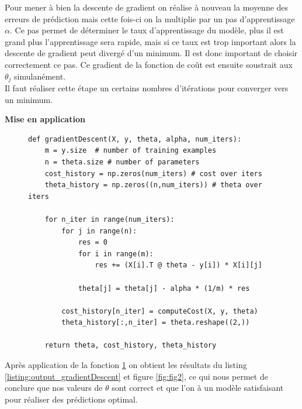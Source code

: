 Pour mener à bien la descente de gradient on réalise à nouveau la moyenne des erreurs de prédiction mais cette fois-ci on la multiplie par un pas d'apprentissage $\alpha$. Ce pas permet de déterminer le taux d'apprentissage du modèle, 
plus il est grand plus l'apprentissage sera rapide, mais si ce taux est trop important alors la descente de gradient peut divergé d'un minimum. Il est donc important de choisir correctement ce pas. Ce gradient de la fonction de coût est ensuite
soustrait aux $\theta_j$ simulanément. \\
Il faut réaliser cette étape un certains nombres d'itérations pour converger vers un minimum.

\clearpage

\vspace{.5cm}
\noindent
\textbf{Mise en application}
\vspace{.2cm}

\begin{figure}[!h]
\begin{verbatim}
def gradientDescent(X, y, theta, alpha, num_iters):  
    m = y.size  # number of training examples
    n = theta.size # number of parameters
    cost_history = np.zeros(num_iters) # cost over iters
    theta_history = np.zeros((n,num_iters)) # theta over iters

    for n_iter in range(num_iters):
        for j in range(n):
            res = 0
            for i in range(m):
                res += (X[i].T @ theta - y[i]) * X[i][j]
            
            theta[j] = theta[j] - alpha * (1/m) * res

        cost_history[n_iter] = computeCost(X, y, theta)
        theta_history[:,n_iter] = theta.reshape((2,))
    
    return theta, cost_history, theta_history
\end{verbatim}   
\label{listing:gradient_descente}
\end{figure}

Après application de la fonction \ref{listing:gradient_descente} on obtient les résultats du listing \ref{listing:output_gradientDescent} et figure \ref{fig:fig2}, ce qui nous permet de conclure que nos valeurs de $\theta$ sont correct et que l'on à un modèle satisfaisant pour 
réaliser des prédictions optimal.

